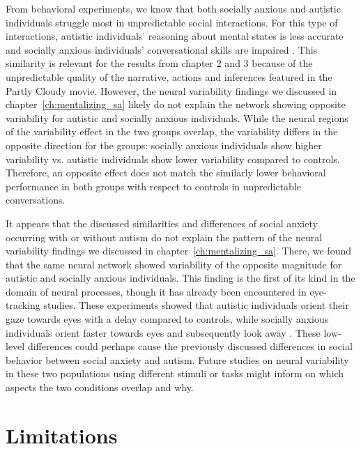 From behavioral experiments, we know that both socially anxious and autistic individuals struggle most in unpredictable social interactions. For this type of interactions, autistic individuals' reasoning about mental states is less accurate and socially anxious individuals' conversational skills are impaired \citep{roeyers2001,ponnet2008,pilkonis1977,thompson2002}. This similarity is relevant for the results from chapter 2 and 3 because of the unpredictable quality of the narrative, actions and inferences featured in the Partly Cloudy movie. However, the neural variability findings we discussed in chapter~\ref{ch:mentalizing_sa} likely do not explain the network showing opposite variability for autistic and socially anxious individuals. While the neural regions of the variability effect in the two groups overlap, the variability differs in the opposite direction for the groups: socially anxious individuals show higher variability vs. autistic individuals show lower variability compared to controls. Therefore, an opposite effect does not match the similarly lower behavioral performance in both groups with respect to controls in unpredictable conversations.

It appears that the discussed similarities and differences of social anxiety occurring with or without autism do not explain the pattern of the neural variability findings we discussed in chapter~\ref{ch:mentalizing_sa}. There, we found that the same neural network showed variability of the opposite magnitude for autistic and socially anxious individuals. This finding is the first of its kind in the domain of neural processes, though it has already been encountered in eye-tracking studies. These experiments showed that autistic individuals orient their gaze towards eyes with a delay compared to controls, while socially anxious individuals orient faster towards eyes and subsequently look away \citep{ni2023,kleberg2017}. These low-level differences could perhaps cause the previously discussed differences in social behavior between social anxiety and autism. Future studies on neural variability in these two populations using different stimuli or tasks might inform on which aspects the two conditions overlap and why.

\section{Limitations}

